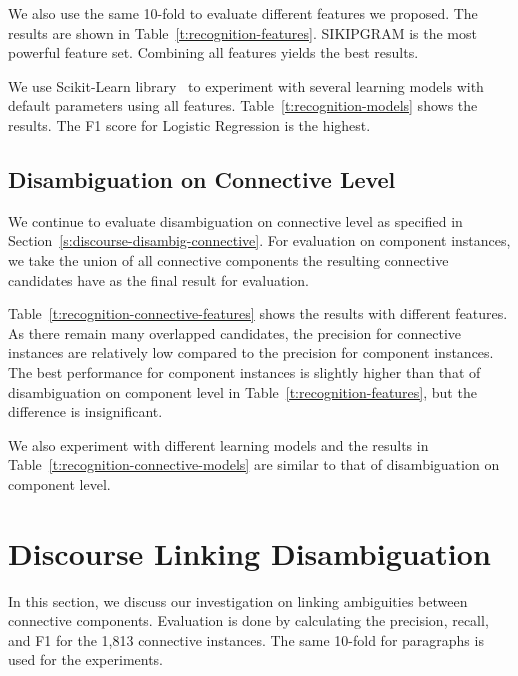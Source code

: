 We also use the same 10-fold to evaluate different features we proposed.
The results are shown in Table~\ref{t:recognition-features}. SIKIPGRAM
is the most powerful feature set. Combining all features yields the best results.



We use Scikit-Learn library~\citep{scikit-learn} to experiment with
several learning models with default parameters using all features.
Table~\ref{t:recognition-models} shows the results. The F1 score for Logistic
Regression is the highest.




\subsection{Disambiguation on Connective Level}

We continue to  evaluate disambiguation on connective level as specified in
Section~\ref{s:discourse-disambig-connective}. For evaluation on component instances,
we take the union of all connective components the resulting connective candidates
have as the final result for evaluation.

Table~\ref{t:recognition-connective-features} shows the results with different features.
As there remain many overlapped candidates, the precision for connective instances
are relatively low compared to the precision for component instances. The best performance
for component instances is slightly higher than that of disambiguation on component level in
Table~\ref{t:recognition-features},
but the difference is insignificant.



We also experiment with different learning models and the results
in Table~\ref{t:recognition-connective-models} are similar to that of disambiguation on
component level.



\section{Discourse Linking Disambiguation}
\label{s:linking-exp}

In this section, we discuss our investigation on linking ambiguities between connective
components. Evaluation is done by calculating the precision, recall, and F1 for the
1,813 connective instances.
The same 10-fold for paragraphs is used for the experiments.

